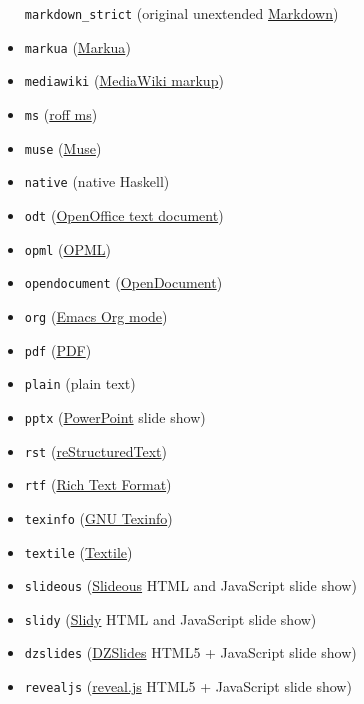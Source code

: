 \documentclass[
  a4paper,
]{article}
\begin{document}
\begin{description}
\begin{itemize}
  \texttt{markdown\_strict} (original unextended
  \href{https://daringfireball.net/projects/markdown/}{Markdown})
\item
  \texttt{markua} (\href{https://leanpub.com/markua/read}{Markua})
\item
  \texttt{mediawiki}
  (\href{https://www.mediawiki.org/wiki/Help:Formatting}{MediaWiki
  markup})
\item
  \texttt{ms} (\href{https://man.cx/groff_ms(7)}{roff ms})
\item
  \texttt{muse} (\href{https://amusewiki.org/library/manual}{Muse})
\item
  \texttt{native} (native Haskell)
\item
  \texttt{odt}
  (\href{https://en.wikipedia.org/wiki/OpenDocument}{OpenOffice text
  document})
\item
  \texttt{opml} (\href{http://dev.opml.org/spec2.html}{OPML})
\item
  \texttt{opendocument}
  (\href{http://opendocument.xml.org}{OpenDocument})
\item
  \texttt{org} (\href{https://orgmode.org}{Emacs Org mode})
\item
  \texttt{pdf} (\href{https://www.adobe.com/pdf/}{PDF})
\item
  \texttt{plain} (plain text)
\item
  \texttt{pptx}
  (\href{https://en.wikipedia.org/wiki/Microsoft_PowerPoint}{PowerPoint}
  slide show)
\item
  \texttt{rst}
  (\href{https://docutils.sourceforge.io/docs/ref/rst/introduction.html}{reStructuredText})
\item
  \texttt{rtf}
  (\href{https://en.wikipedia.org/wiki/Rich_Text_Format}{Rich Text
  Format})
\item
  \texttt{texinfo} (\href{https://www.gnu.org/software/texinfo/}{GNU
  Texinfo})
\item
  \texttt{textile} (\href{https://textile-lang.com}{Textile})
\item
  \texttt{slideous}
  (\href{https://goessner.net/articles/slideous/}{Slideous} HTML and
  JavaScript slide show)
\item
  \texttt{slidy} (\href{https://www.w3.org/Talks/Tools/Slidy2/}{Slidy}
  HTML and JavaScript slide show)
\item
  \texttt{dzslides} (\href{https://paulrouget.com/dzslides/}{DZSlides}
  HTML5 + JavaScript slide show)
\item
  \texttt{revealjs} (\href{https://revealjs.com/}{reveal.js} HTML5 +
  JavaScript slide show)

\end{itemize}
\end{description}
\end{document}
